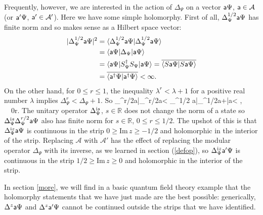 \documentclass[12pt]{article}
\def\Bbb{\mathbb}
\def\a{{\sf a}}
\def\bar{\overline}
\def\ra{\rangle}
\def\la{\langle}
\def\R{{\Bbb{R}}}\def\Z{{\Bbb{Z}}}
\numberwithin{equation}{section}
\def\Z{{\Bbb Z}}
\def\bar{\overline}
\def\A{{\mathcal A}}
\def\bar{\overline}
\begin{document}
    Frequently, however, we are interested in the action of $\Delta_\Psi$ on a vector $\a\Psi$, $\a\in \A$ (or $\a'\Psi$, $\a'\in\A'$).  
    Here we have some simple holomorphy.   First of all, $\Delta_\Psi^{1/2} \a\Psi$ has finite norm and so makes sense as a Hilbert
    space vector:
    \begin{align}\begin{split}\label{prox} |\Delta_\Psi^{1/2}\a\Psi|^2 &=\la \Delta_\Psi^{1/2}\a\Psi|\Delta_\Psi^{1/2}\a\Psi\ra\\ &=\la \a\Psi|\Delta_\Psi|\a\Psi\ra \\
    & =\la \a\Psi|S^\dagger_\Psi S_\Psi|\a\Psi\ra = \bar{\la S \a\Psi|S \a\Psi\ra}\\ &=\bar{\la \a^\dagger\Psi|\a^\dagger\Psi\ra}<\infty. \end{split}\end{align}
    On the other hand, for $0\leq r\leq 1$,  the inequality $\lambda^r<\lambda+1$ for a positive real number $\lambda$ implies
    $\Delta_\Psi^r<\Delta_\Psi+1$.   So
    \be\label{woox} \la \Delta_\Psi^{r/2}\a\Psi|\Delta_\Psi^{r/2}\a\Psi\ra< \la \Delta_\Psi^{1/2}
    \a\Psi|\Delta_\Psi^{1/2}\a\Psi\ra +\la \a\Psi|\a\Psi\ra <    \infty, ~~0\leq r.\ee
    The unitary operator $\Delta_\Psi^{{\mathrm i} s}$, $s\in \R$ does not change the norm of a state  so  $\Delta_\Psi^{\i s}\Delta_\Psi^{r/2}\a\Psi$
    also has finite norm for $s\in\R$,
    $0\leq r\leq 1/2$.   The upshot of this is that $\Delta_\Psi^{\i z} \a\Psi$ is continuous in the strip 
    $0\geq\mathrm{Im}\,z\geq -1/2$ and holomorphic in the interior of the strip.  Replacing $\A$ with $\A'$ has the effect of replacing
    the modular operator $\Delta_\Psi$ with its inverse, as we learned in section (\ref{defop}), so $\Delta_\Psi^{\i z} \a'\Psi$ is
   continuous in the strip $1/2\geq \mathrm{Im}\,z\geq 0$ and holomorphic in the interior of the strip.

    
    In section \ref{more}, we will find in a basic quantum field theory example that the holomorphy statements that we have just made
    are the best possible: generically, $\Delta^z \a\Psi$ and $\Delta^z \a'\Psi$ cannot be continued outside the strips that we have
    identified.    
    
\end{document}
